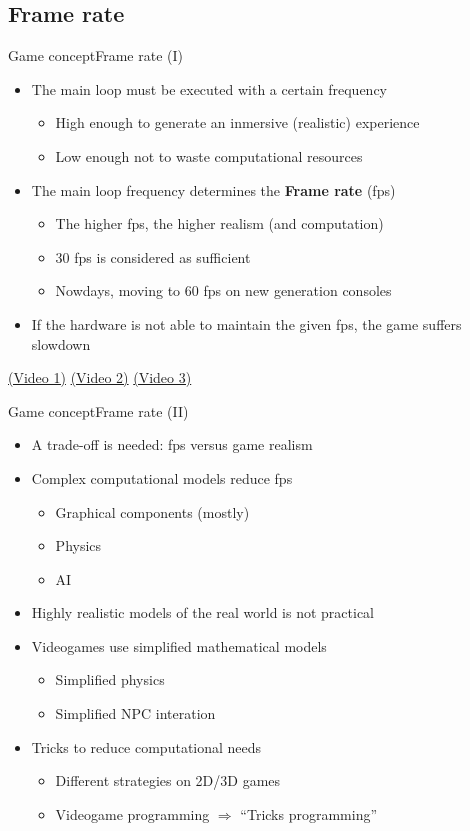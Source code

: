 \documentclass[10pt,compress]{beamer} %
\begin{document}
\subsection[Frame rate]{Frame rate}
\begin{frame}{Game concept}{Frame rate (I)}
	\begin{itemize}
	\item The main loop must be executed with a certain frequency
		\begin{itemize}
		\item High enough to generate an inmersive (realistic) experience
		\item Low enough not to waste computational resources
		\end{itemize}
	\item The main loop frequency determines the \textbf{Frame rate} (fps)
		\begin{itemize}
		\item The higher fps, the higher realism (and computation)
		\item 30 fps is considered as sufficient
		\item Nowdays, moving to 60 fps on new generation consoles
		\end{itemize}
	\item If the hardware is not able to maintain the given fps, the game suffers slowdown
	\end{itemize}
	\href{https://youtu.be/PLhPvS0hZSs?t=1m21s}{(Video 1)} \href{https://www.youtube.com/watch?v=RzcZAJM6ECQ}{(Video 2)} \href{https://youtu.be/AwnQ6qF8Ots?t=1m38s}{(Video 3)} 
\end{frame}

\begin{frame}{Game concept}{Frame rate (II)}
	\begin{itemize}
	\item A trade-off is needed: fps versus game realism
	\item Complex computational models reduce fps
		\begin{itemize}
		\item Graphical components (mostly)
		\item Physics
		\item AI
		\end{itemize}
	\item Highly realistic models of the real world is not practical
	\item Videogames use simplified mathematical models
		\begin{itemize}
		\item Simplified physics
		\item Simplified NPC interation
		\end{itemize}
	\item Tricks to reduce computational needs
		\begin{itemize}
		\item Different strategies on 2D/3D games
		\item Videogame programming $\Rightarrow$ ``Tricks programming''
		\end{itemize}
	\end{itemize}
\end{frame}
\end{document}
